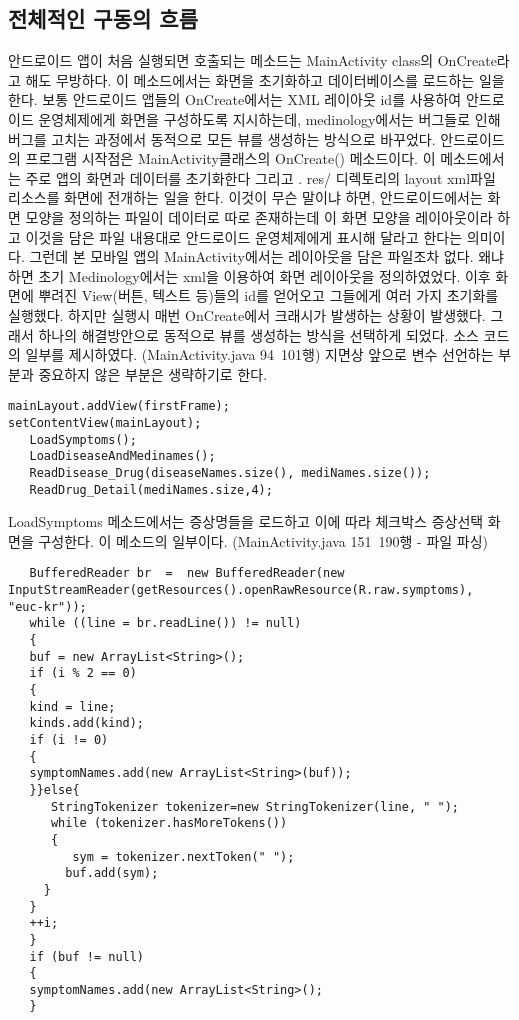 \documentclass{report}
\begin{document}
\subsection{전체적인 구동의 흐름}
안드로이드 앱이 처음 실행되면 호출되는 메소드는 MainActivity class의 OnCreate라고 해도 무방하다. 이 메소드에서는 화면을 초기화하고 데이터베이스를 로드하는 일을 한다. 보통 안드로이드 앱들의 OnCreate에서는 XML 레이아웃 id를 사용하여 안드로이드 운영체제에게 화면을 구성하도록 지시하는데, medinology에서는 버그들로 인해 버그를 고치는 과정에서 동적으로 모든 뷰를 생성하는 방식으로 바꾸었다.
안드로이드의 프로그램 시작점은 MainActivity클래스의 OnCreate() 메소드이다. 이 메소드에서는 주로 앱의 화면과 데이터를 초기화한다 그리고 . res/ 디렉토리의 layout xml파일 리소스를 화면에 전개하는 일을 한다. 이것이 무슨 말이냐 하면, 안드로이드에서는 화면 모양을 정의하는 파일이 데이터로 따로 존재하는데 이 화면 모양을 레이아웃이라 하고 이것을 담은 파일 내용대로 안드로이드 운영체제에게 표시해 달라고 한다는 의미이다. 그런데 본 모바일 앱의 MainActivity에서는 레이아웃을 담은 파일조차 없다. 왜냐하면 초기 Medinology에서는 xml을 이용하여 화면 레이아웃을 정의하였었다. 이후 화면에 뿌려진 View(버튼, 텍스트 등)들의 id를 얻어오고 그들에게 여러 가지 초기화를 실행했다. 하지만  실행시 매번 OnCreate에서 크래시가 발생하는 상황이 발생했다. 그래서 하나의 해결방안으로 동적으로 뷰를 생성하는 방식을 선택하게 되었다.
소스 코드의 일부를 제시하였다. (MainActivity.java 94~101행) 지면상 앞으로 변수 선언하는 부분과 중요하지 않은 부분은 생략하기로 한다.
\begin{verbatim}
mainLayout.addView(firstFrame);
setContentView(mainLayout);
   LoadSymptoms();
   LoadDiseaseAndMedinames();
   ReadDisease_Drug(diseaseNames.size(), mediNames.size());
   ReadDrug_Detail(mediNames.size,4);
\end{verbatim}
LoadSymptoms 메소드에서는 증상명들을 로드하고 이에 따라 체크박스 증상선택 화면을 구성한다. 이 메소드의 일부이다. (MainActivity.java 151~190행 - 파일 파싱)
\begin{verbatim}
   BufferedReader br  =  new BufferedReader(new InputStreamReader(getResources().openRawResource(R.raw.symptoms), "euc-kr"));
   while ((line = br.readLine()) != null)
   {
   buf = new ArrayList<String>();
   if (i % 2 == 0)
   {
   kind = line;
   kinds.add(kind);
   if (i != 0)
   {
   symptomNames.add(new ArrayList<String>(buf));
   }}else{
      StringTokenizer tokenizer=new StringTokenizer(line, " ");
      while (tokenizer.hasMoreTokens())
      {
         sym = tokenizer.nextToken(" ");   
        buf.add(sym);
     }
   }
   ++i;
   }
   if (buf != null)
   {
   symptomNames.add(new ArrayList<String>();
   }
\end{verbatim}
\end{document}
